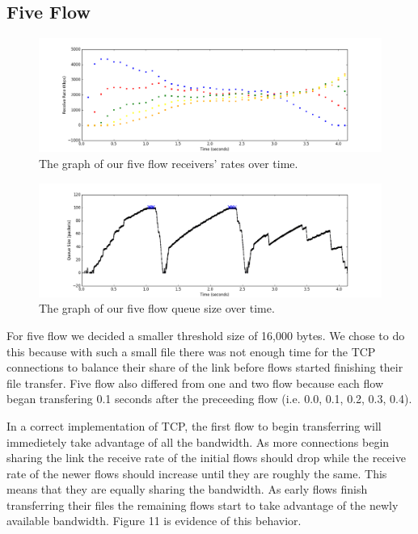 \documentclass[11pt]{article}
\begin{document}
\subsection{Five Flow}

\begin{figure}[H]
\caption{The graph of our five flow receivers' rates over time.}
  \label{figure11}
    \centering
    \includegraphics[width=\linewidth]{5f_rate.png}
\end{figure}

\begin{figure}[H]
\caption{The graph of our five flow queue size over time.}
  \label{figure12}
    \centering
    \includegraphics[width=\linewidth]{5f_queue.png}
\end{figure}

For five flow we decided a smaller threshold size of 16,000 bytes. We chose to do this because with such a small file there was not enough time for the TCP connections to balance their share of the link before flows started finishing their file transfer. Five flow also differed from one and two flow because each flow began transfering 0.1 seconds after the preceeding flow (i.e. 0.0, 0.1, 0.2, 0.3, 0.4).

In a correct implementation of TCP, the first flow to begin transferring will immedietely take advantage of all the bandwidth. As more connections begin sharing the link the receive rate of the initial flows should drop while the receive rate of the newer flows should increase until they are roughly the same. This means that they are equally sharing the bandwidth. As early flows finish transferring their files the remaining flows start to take advantage of the newly available bandwidth. Figure 11 is evidence of this behavior. 
\end{document}
